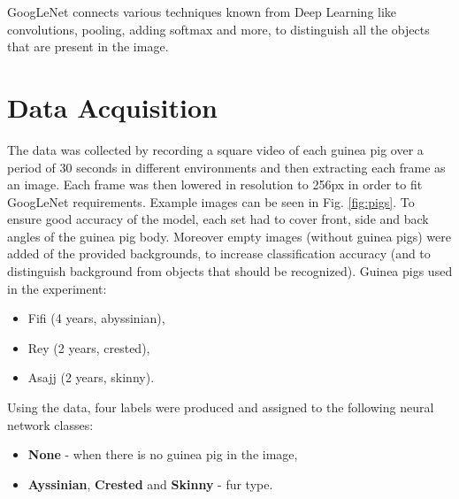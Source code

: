 \documentclass[10pt,journal,compsoc]{IEEEtran}
\begin{document}
    GoogLeNet connects various techniques known from Deep Learning like convolutions, pooling, adding softmax and more, to distinguish all the objects that are present in the image. 

    \section{Data Acquisition}
    The data was collected by recording a square video of each guinea pig over a period of 30 seconds in different environments and then extracting each frame as an image. Each frame was then lowered in resolution to 256px in order to fit GoogLeNet requirements. Example images can be seen in Fig. \ref{fig:pigs}.
    \newline\newline
    To ensure good accuracy of the model, each set had to cover front, side and back angles of the guinea pig body. Moreover empty images (without guinea pigs) were added of the provided backgrounds, to increase classification accuracy (and to distinguish background from objects that should be recognized).
    \newline\newline
    Guinea pigs used in the experiment:

    \begin{itemize}
        \item Fifi (4 years, abyssinian),
        \item Rey (2 years, crested),
        \item Asajj (2 years, skinny).
    \end{itemize}

    \noindent Using the data, four labels were produced and assigned to the following neural network classes:

    \begin{itemize}
        \item \textbf{None} - when there is no guinea pig in the image,
        \item \textbf{Ayssinian}, \textbf{Crested} and \textbf{Skinny} - fur type.
    \end{itemize}
\end{document}
